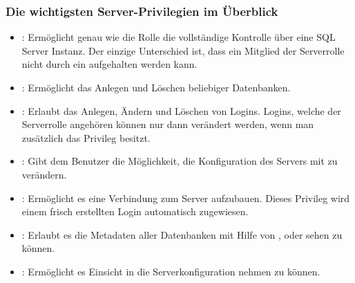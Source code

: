         \subsubsection{Die wichtigsten Server-Privilegien im Überblick}
          \begin{itemize}
            \item {}: Ermöglicht genau wie die Rolle
             die vollständige Kontrolle über eine SQL
            Server Instanz. Der einzige Unterschied ist, dass ein Mitglied der
            Serverrolle  nicht durch ein 
            aufgehalten werden kann.
            \item {}: Ermöglicht das Anlegen und
            Löschen beliebiger Datenbanken.
            \item  {}: Erlaubt das Anlegen,
            Ändern und Löschen von Logins. Logins, welche der Serverrolle
             angehören können nur dann verändert werden,
            wenn man zusätzlich das Privileg 
            besitzt.
            \item {}: Gibt dem Benutzer die Möglichkeit,
            die Konfiguration des Servers mit  zu
            verändern.
            \item {}: Ermöglicht es eine Verbindung zum
            Server aufzubauen. Dieses Privileg wird einem frisch erstellten
            Login automatisch zugewiesen.
            \item {}: Erlaubt es die Metadaten aller
            Datenbanken mit Hilfe von ,
             oder  sehen zu
            können.
            \item {}: Ermöglicht es Einsicht in die
            Serverkonfiguration nehmen zu können.
          \end{itemize}
          \begin{literaturinternet}
            \item \cite{mssqltips1714}
            \item \cite{practdbacocsp}
          \end{literaturinternet}
